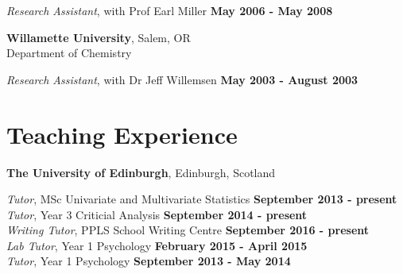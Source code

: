 \documentclass[margin,line]{res}
\begin{document}
\begin{resume}
\vspace{-.2cm}
{\em Research Assistant}, with Prof Earl Miller \hfill {\bf May 2006 - May 2008}\\
\vspace{-.3cm}


\vspace{-.1cm}

{\bf Willamette University}, Salem, OR \\
Department of Chemistry

\vspace{-.2cm}
{\em Research Assistant}, with Dr Jeff Willemsen \hfill {\bf May 2003 - August 2003}\\

\vspace{-.1cm}


\section{\sc Teaching Experience}

{\bf  The University of Edinburgh}, Edinburgh, Scotland

\vspace{-.3cm}

\vspace{.1cm}
{\em Tutor}, MSc Univariate and Multivariate Statistics \hfill {\bf September 2013 - present}\\

\vspace{-.4cm}
{\em Tutor}, Year 3 Criticial Analysis \hfill {\bf September 2014 - present}\\

\vspace{-.4cm}
{\em Writing Tutor}, PPLS School Writing Centre \hfill {\bf September 2016 - present}\\

\vspace{-.4cm}
{\em Lab Tutor}, Year 1 Psychology \hfill {\bf February 2015 - April 2015}\\

\vspace{-.4cm}
{\em Tutor}, Year 1 Psychology \hfill {\bf September 2013 - May 2014}\\
\vspace{-.3cm}


\end{resume}
\end{document}
